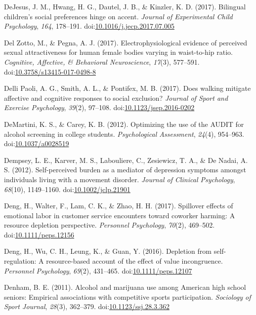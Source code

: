 \documentclass[english,man]{apa6}
\theoremstyle{definition}
\theoremstyle{definition}
\theoremstyle{definition}
\theoremstyle{remark}
\begin{document}
\hypertarget{ref-DeJesus2017}{}
DeJesus, J. M., Hwang, H. G., Dautel, J. B., \& Kinzler, K. D. (2017).
Bilingual children's social preferences hinge on accent. \emph{Journal
of Experimental Child Psychology}, \emph{164}, 178--191.
doi:\href{https://doi.org/10.1016/j.jecp.2017.07.005}{10.1016/j.jecp.2017.07.005}

\hypertarget{ref-DelZotto2017}{}
Del Zotto, M., \& Pegna, A. J. (2017). Electrophysiological evidence of
perceived sexual attractiveness for human female bodies varying in
waist-to-hip ratio. \emph{Cognitive, Affective, \& Behavioral
Neuroscience}, \emph{17}(3), 577--591.
doi:\href{https://doi.org/10.3758/s13415-017-0498-8}{10.3758/s13415-017-0498-8}

\hypertarget{ref-Paoli2017}{}
Delli Paoli, A. G., Smith, A. L., \& Pontifex, M. B. (2017). Does
walking mitigate affective and cognitive responses to social exclusion?
\emph{Journal of Sport and Exercise Psychology}, \emph{39}(2), 97--108.
doi:\href{https://doi.org/10.1123/jsep.2016-0202}{10.1123/jsep.2016-0202}

\hypertarget{ref-DeMartini2012}{}
DeMartini, K. S., \& Carey, K. B. (2012). Optimizing the use of the
AUDIT for alcohol screening in college students. \emph{Psychological
Assessment}, \emph{24}(4), 954--963.
doi:\href{https://doi.org/10.1037/a0028519}{10.1037/a0028519}

\hypertarget{ref-Dempsey2012}{}
Dempsey, L. E., Karver, M. S., Labouliere, C., Zesiewicz, T. A., \& De
Nadai, A. S. (2012). Self-perceived burden as a mediator of depression
symptoms amongst individuals living with a movement disorder.
\emph{Journal of Clinical Psychology}, \emph{68}(10), 1149--1160.
doi:\href{https://doi.org/10.1002/jclp.21901}{10.1002/jclp.21901}

\hypertarget{ref-Deng2017}{}
Deng, H., Walter, F., Lam, C. K., \& Zhao, H. H. (2017). Spillover
effects of emotional labor in customer service encounters toward
coworker harming: A resource depletion perspective. \emph{Personnel
Psychology}, \emph{70}(2), 469--502.
doi:\href{https://doi.org/10.1111/peps.12156}{10.1111/peps.12156}

\hypertarget{ref-Deng2016}{}
Deng, H., Wu, C. H., Leung, K., \& Guan, Y. (2016). Depletion from
self-regulation: A resource-based account of the effect of value
incongruence. \emph{Personnel Psychology}, \emph{69}(2), 431--465.
doi:\href{https://doi.org/10.1111/peps.12107}{10.1111/peps.12107}

\hypertarget{ref-Denham2011}{}
Denham, B. E. (2011). Alcohol and marijuana use among American high
school seniors: Empirical associations with competitive sports
participation. \emph{Sociology of Sport Journal}, \emph{28}(3),
362--379.
doi:\href{https://doi.org/10.1123/ssj.28.3.362}{10.1123/ssj.28.3.362}
\end{document}
